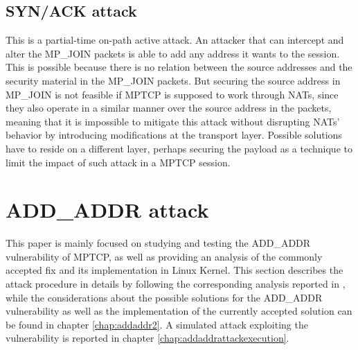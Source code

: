 \subsection{SYN/ACK attack}
This is a partial-time on-path active attack. An attacker that can intercept and alter the MP\_JOIN packets is able to add any address it wants to the session. This is possible because there is no relation between the source addresses and the security material in the MP\_JOIN packets. But securing the source address in MP\_JOIN is not feasible if MPTCP is supposed to work through NATs, since they also operate in a similar manner over the source address in the packets, meaning that it is impossible to mitigate this attack without disrupting NATs' behavior by introducing modifications at the transport layer. Possible solutions have to reside on a different layer, perhaps securing the payload as a technique to limit the impact of such attack in a MPTCP session.

\section{ADD\_ADDR attack} 
\label{theaddaddrattack}
This paper is mainly focused on studying and testing the ADD\_ADDR vulnerability of MPTCP, as well as providing an analysis of the commonly accepted fix and its implementation in Linux Kernel. This section describes the attack procedure in details by following the corresponding analysis reported in , while the considerations about the possible solutions for the ADD\_ADDR vulnerability as well as the implementation of the currently accepted solution can be found in chapter \ref{chap:addaddr2}. A simulated attack exploiting the vulnerability is reported in chapter \ref{chap:addaddrattackexecution}.

